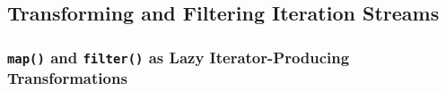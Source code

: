 \subsection{Transforming and Filtering Iteration Streams}
\subsubsection{\texttt{map()} and \texttt{filter()} as Lazy Iterator-Producing Transformations}
